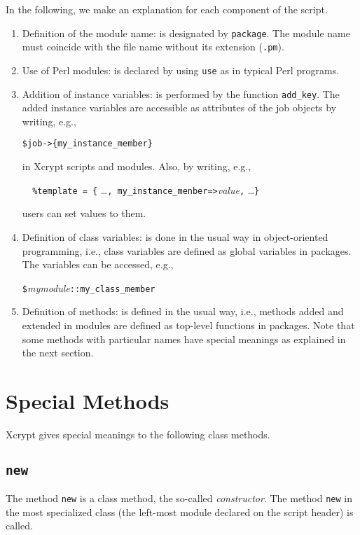 \documentclass[a4paper,10pt]{report}
\def\|{\verb|} %|
\begin{document}
In the following, we make an explanation for each component of the script.
\begin{enumerate}
  \item Definition of the module name: is designated by \|package|.
	The module name must coincide with the file name
        without its extension (\|.pm|).
  \item Use of Perl modules: is declared by using \|use|
        as in typical Perl programs.
  \item Addition of instance variables: is performed by the function
	\|add_key|.  The added instance variables are accessible as
	attributes of the job objects by writing, e.g.,
	\begin{center}
	 \|$job->{my_instance_member}|%
	\end{center}
	in Xcrypt scripts and modules.  Also, by writing, e.g.,
	\begin{center}
	 \|  |\|%
	\end{center}
	users can set values to them.
 \item Definition of class variables: is done in the usual way in
       object-oriented programming, i.e., class variables are defined
       as global variables in packages.  The variables can be
       accessed, e.g.,
	 \begin{center}
	  \|$|{\it mymodule}\|::my_class_member| %
	 \end{center}
  \item Definition of methods: is defined in the usual way, i.e.,
	methods added and extended in modules are defined as top-level
	functions in packages.  Note that some methods with
	particular names have special meanings as explained in the next
	section.
\end{enumerate}

\section{Special Methods}

Xcrypt gives special meanings to the following class methods.

\subsection{\texttt{new}}

The method \texttt{new} is a class method, the so-called
\textit{constructor}.  The method \|new| in the most specialized class
(the left-most module declared on the script header) is called.
\end{document}
